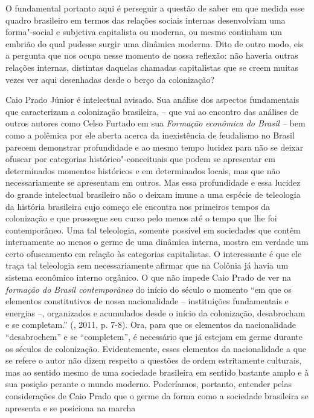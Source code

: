 {O fundamental portanto aqui é perseguir a questão de saber em que medida
esse quadro brasileiro em termos das relações sociais internas
desenvolviam uma forma"-social e subjetiva capitalista ou moderna, ou
mesmo continham um embrião do qual pudesse surgir uma dinâmica moderna.
Dito de outro modo, eis a pergunta que nos ocupa nesse momento de nossa
reflexão: não haveria outras relações internas, distintas daquelas
chamadas capitalistas que se creem muitas vezes ver aqui desenhadas
desde o berço da colonização?

Caio Prado Júnior é intelectual avisado. Sua análise dos aspectos
fundamentais que caracterizam a colonização brasileira, -- que vai ao
encontro das análises de outros autores como Celso Furtado em sua
\emph{Formação econômica do Brasil --} bem como a polêmica por ele
aberta acerca da inexistência de feudalismo no Brasil parecem demonstrar
profundidade e ao mesmo tempo lucidez para não se deixar ofuscar por
categorias histórico"-conceituais que podem se apresentar em determinados
momentos históricos e em determinados locais, mas que não
necessariamente se apresentam em outros. Mas essa profundidade e essa
lucidez do grande intelectual brasileiro não o deixam imune a uma
espécie de teleologia da história brasileira cujo começo ele encontra
nos primeiros tempos da colonização e que prossegue seu curso pelo menos
até o tempo que lhe foi contemporâneo. Uma tal teleologia, somente
possível em sociedades que contêm internamente ao menos o germe de
uma dinâmica interna, mostra em verdade um certo ofuscamento em relação
às categorias capitalistas. O interessante é que ele traça tal
teleologia sem necessariamente afirmar que na Colônia já havia um
sistema econômico interno orgânico. O que não impede Caio Prado de ver
na \emph{formação do Brasil contemporâneo} do início do século  o
momento ``em que os elementos constitutivos de nossa nacionalidade --
instituições fundamentais e energias --, organizados e acumulados desde
o início da colonização, desabrocham e se completam.'' (, 2011, p.
7-8). Ora, para que os elementos da nacionalidade ``desabrochem'' e se
``completem'', é necessário que já estejam em germe durante os séculos
de colonização. Evidentemente, esses elementos da nacionalidade a que se
refere o autor não dizem respeito a questões de ordem estritamente
culturais, mas ao sentido mesmo de uma sociedade brasileira em sentido
bastante amplo e à sua posição perante o mundo moderno. Poderíamos,
portanto, entender pelas considerações de Caio Prado que o germe da
forma como a sociedade brasileira se apresenta e se posiciona na marcha
}
